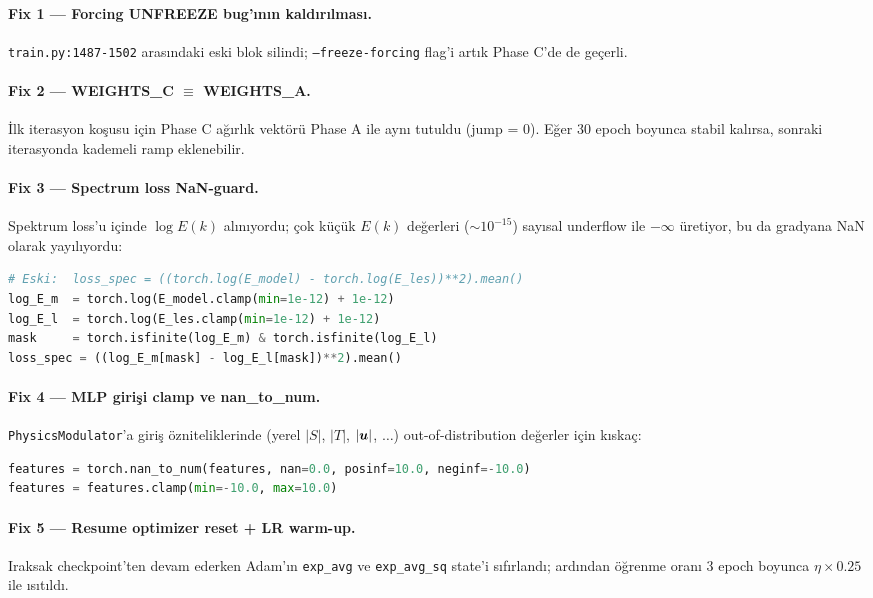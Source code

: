 \paragraph{Fix 1 --- Forcing UNFREEZE bug'ının kaldırılması.} \texttt{train.py:1487-1502} arasındaki eski blok silindi; \texttt{--freeze-forcing} flag'i artık Phase C'de de geçerli.

\paragraph{Fix 2 --- WEIGHTS\_C $\equiv$ WEIGHTS\_A.} İlk iterasyon koşusu için Phase C ağırlık vektörü Phase A ile aynı tutuldu (jump = 0). Eğer 30 epoch boyunca stabil kalırsa, sonraki iterasyonda kademeli ramp eklenebilir.

\paragraph{Fix 3 --- Spectrum loss NaN-guard.} Spektrum loss'u içinde $\log E(k)$ alınıyordu; çok küçük $E(k)$ değerleri ($\sim 10^{-15}$) sayısal underflow ile $-\infty$ üretiyor, bu da gradyana NaN olarak yayılıyordu:
\begin{lstlisting}[language=Python,caption={Spectrum loss NaN-guard}]
# Eski:  loss_spec = ((torch.log(E_model) - torch.log(E_les))**2).mean()
log_E_m  = torch.log(E_model.clamp(min=1e-12) + 1e-12)
log_E_l  = torch.log(E_les.clamp(min=1e-12) + 1e-12)
mask     = torch.isfinite(log_E_m) & torch.isfinite(log_E_l)
loss_spec = ((log_E_m[mask] - log_E_l[mask])**2).mean()
\end{lstlisting}

\paragraph{Fix 4 --- MLP girişi clamp ve nan\_to\_num.} \texttt{PhysicsModulator}'a giriş özniteliklerinde (yerel $|S|$, $|T|$, $|\bm{u}|$, $\ldots$) out-of-distribution değerler için kıskaç:
\begin{lstlisting}[language=Python]
features = torch.nan_to_num(features, nan=0.0, posinf=10.0, neginf=-10.0)
features = features.clamp(min=-10.0, max=10.0)
\end{lstlisting}

\paragraph{Fix 5 --- Resume optimizer reset + LR warm-up.} Iraksak checkpoint'ten devam ederken Adam'ın \texttt{exp\_avg} ve \texttt{exp\_avg\_sq} state'i sıfırlandı; ardından öğrenme oranı 3 epoch boyunca $\eta \times 0.25$ ile ısıtıldı.

